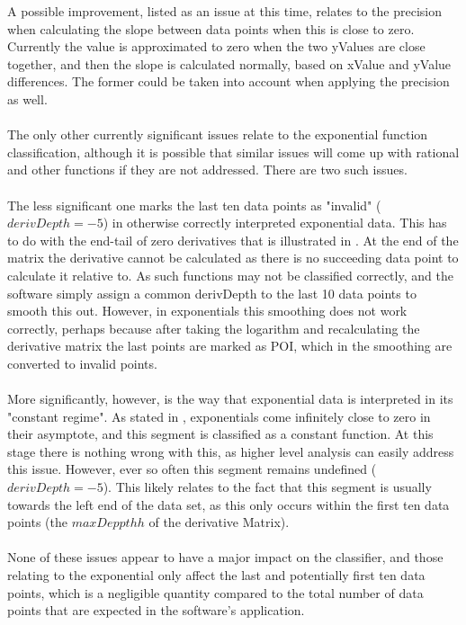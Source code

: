 \documentclass[main.tex]{subfiles}
\begin{document}
    A possible improvement, listed as an issue at this time, relates to the precision when calculating the slope between data points when this is close to zero. Currently the value is approximated to zero when the two yValues are close together, and then the slope is calculated normally, based on xValue and yValue differences. The former could be taken into account when applying the precision as well.
    \\\\
    The only other currently significant issues relate to the exponential function classification, although it is possible that similar issues will come up with rational and other functions if they are not addressed. There are two such issues.
    \\\\
    The less significant one marks the last ten data points as "invalid" ($derivDepth=-5$) in otherwise correctly interpreted exponential data. This has to do with the end-tail  of zero derivatives that is illustrated in . At the end of the matrix the derivative cannot be calculated as there is no succeeding data point to calculate it relative to. As such functions may not be classified correctly, and the software simply assign a common derivDepth to the last 10 data points to smooth this out. However, in exponentials this smoothing does not work correctly, perhaps because after taking the logarithm and recalculating the derivative matrix the last points are marked as POI, which in the smoothing are converted to invalid points.
    \\\\
    More significantly, however, is the way that exponential data is interpreted in its "constant regime". As stated in , exponentials come infinitely close to zero in their asymptote, and this segment is classified as a constant function. At this stage there is nothing wrong with this, as higher level analysis can easily address this issue. However, ever so often this segment remains undefined ($derivDepth=-5$). This likely relates to the fact that this segment is usually towards the left end of the data set, as this only occurs within the first ten data points (the $maxDeppthh$ of the derivative Matrix). 
    \\\\
    None of these issues appear to have a major impact on the classifier, and those relating to the exponential only affect the last and potentially first ten data points, which is a negligible quantity compared to the total number of data points that are expected in the software's application.
    
\end{document}
